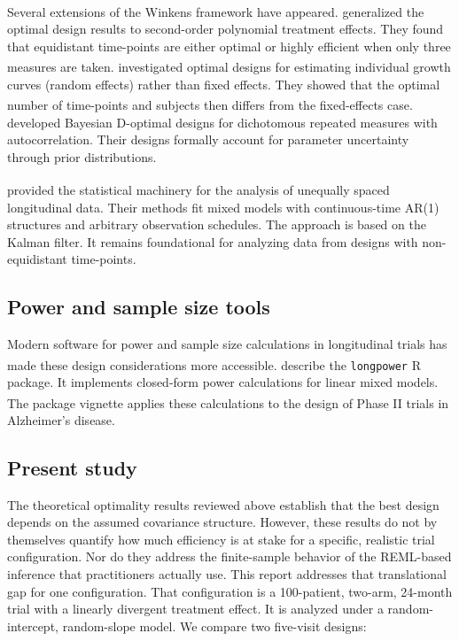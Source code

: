 \documentclass[
  11pt,
]{article}
\begin{document}
Several extensions of the Winkens framework have appeared.\textsuperscript{} generalized the optimal design results to
second-order polynomial treatment effects. They found that
equidistant time-points are either optimal or highly efficient
when only three measures are taken.\textsuperscript{}
investigated optimal designs for estimating individual growth
curves (random effects) rather than fixed effects. They showed
that the optimal number of time-points and subjects then differs
from the fixed-effects case.\textsuperscript{} developed Bayesian
D-optimal designs for dichotomous repeated measures with
autocorrelation. Their designs formally account for parameter
uncertainty through prior distributions.

\textsuperscript{} provided the statistical machinery for the
analysis of unequally spaced longitudinal data. Their methods fit
mixed models with continuous-time AR(1) structures and arbitrary
observation schedules. The approach is based on the Kalman
filter. It remains foundational for analyzing data from designs
with non-equidistant time-points.

\subsection{Power and sample size tools}\label{power-and-sample-size-tools}

Modern software for power and sample size calculations in
longitudinal trials has made these design considerations more
accessible.\textsuperscript{} describe the \texttt{longpower} R
package. It implements closed-form power calculations for linear
mixed models. The package vignette\textsuperscript{} applies
these calculations to the design of Phase II trials in Alzheimer's
disease.

\subsection{Present study}\label{present-study}

The theoretical optimality results reviewed above establish that
the best design depends on the assumed covariance structure.
However, these results do not by themselves quantify how much
efficiency is at stake for a specific, realistic trial
configuration. Nor do they address the finite-sample behavior of
the REML-based inference that practitioners actually use. This
report addresses that translational gap for one configuration.
That configuration is a 100-patient, two-arm, 24-month trial with
a linearly divergent treatment effect. It is analyzed under a
random-intercept, random-slope model. We compare two five-visit
designs:
\end{document}
